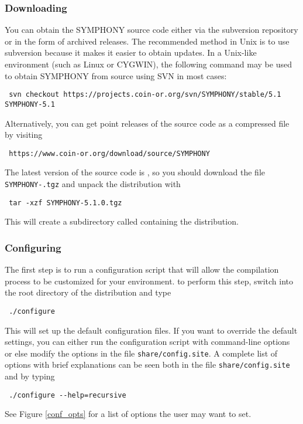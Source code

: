 \subsubsection{Downloading}

You can obtain the SYMPHONY source code either via the subversion repository
or in the form of archived releases. The recommended method in Unix is to use
subversion because it makes it easier to obtain updates. In a Unix-like
environment (such as Linux or CYGWIN), the following command may be used to
obtain SYMPHONY from source using SVN in most cases: {\color{Brown}
\begin{verbatim}
 svn checkout https://projects.coin-or.org/svn/SYMPHONY/stable/5.1 SYMPHONY-5.1
\end{verbatim}
}
Alternatively, you can get point releases of the source code as a compressed
file by visiting
{\color{Brown}
\begin{verbatim}
 https://www.coin-or.org/download/source/SYMPHONY
\end{verbatim}
}
The latest version of the source code is \VER, so you should download the file
{\color{Brown}\texttt{SYMPHONY-\VER.tgz}} and unpack the distribution with 
{\color{Brown}
\begin{verbatim}
 tar -xzf SYMPHONY-5.1.0.tgz
\end{verbatim}
} 
This will create a subdirectory called  containing
the distribution.

\subsubsection{Configuring}\label{configuring}

The first step is to run a configuration script that will allow the
compilation process to be customized for your environment. to perform this
step, switch into the root directory of the distribution and type
{\color{Brown}
\begin{verbatim}
 ./configure 
\end{verbatim}
} This will set up the default configuration files. If you want to override
the default settings, you can either run the configuration script with
command-line options or else modify the options in the file
{\color{Brown}\texttt{share/config.site}}. A complete list of options with
brief explanations can be seen both in the file
{\color{Brown}\texttt{share/config.site}} and by typing 
{\color{Brown}
\begin{verbatim}
 ./configure --help=recursive 
\end{verbatim}
}
See Figure \ref{conf_opts} for a list of options the user may want to set. 

